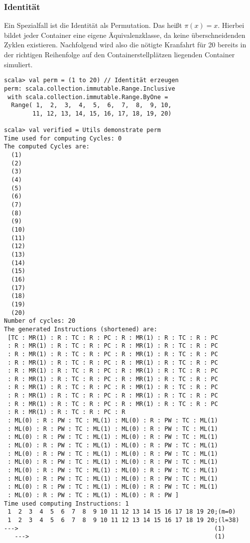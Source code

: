\subsubsection*{Identität}
Ein Spezialfall ist die Identität als Permutation. Das heißt $\pi(x) = x$.
Hierbei bildet jeder Container eine eigene Äquivalenzklasse, da keine überschneidenden Zyklen existieren.
Nachfolgend wird also die nötigte Kranfahrt für 20 bereits in der richtigen Reihenfolge auf den Containerstellplätzen liegenden Container simuliert.
\begin{lstlisting}
scala> val perm = (1 to 20) // Identität erzeugen
perm: scala.collection.immutable.Range.Inclusive
 with scala.collection.immutable.Range.ByOne =
  Range( 1,  2,  3,  4,  5,  6,  7,  8,  9, 10,
        11, 12, 13, 14, 15, 16, 17, 18, 19, 20)

scala> val verified = Utils demonstrate perm
Time used for computing Cycles: 0
The computed Cycles are: 
  (1)
  (2)
  (3)
  (4)
  (5)
  (6)
  (7)
  (8)
  (9)
  (10)
  (11)
  (12)
  (13)
  (14)
  (15)
  (16)
  (17)
  (18)
  (19)
  (20)
Number of cycles: 20
The generated Instructions (shortened) are: 
 [TC : MR(1) : R : TC : R : PC : R : MR(1) : R : TC : R : PC
 : R : MR(1) : R : TC : R : PC : R : MR(1) : R : TC : R : PC
 : R : MR(1) : R : TC : R : PC : R : MR(1) : R : TC : R : PC
 : R : MR(1) : R : TC : R : PC : R : MR(1) : R : TC : R : PC
 : R : MR(1) : R : TC : R : PC : R : MR(1) : R : TC : R : PC
 : R : MR(1) : R : TC : R : PC : R : MR(1) : R : TC : R : PC
 : R : MR(1) : R : TC : R : PC : R : MR(1) : R : TC : R : PC
 : R : MR(1) : R : TC : R : PC : R : MR(1) : R : TC : R : PC
 : R : MR(1) : R : TC : R : PC : R : MR(1) : R : TC : R : PC
 : R : MR(1) : R : TC : R : PC : R
 : ML(0) : R : PW : TC : ML(1) : ML(0) : R : PW : TC : ML(1) 
 : ML(0) : R : PW : TC : ML(1) : ML(0) : R : PW : TC : ML(1)
 : ML(0) : R : PW : TC : ML(1) : ML(0) : R : PW : TC : ML(1)
 : ML(0) : R : PW : TC : ML(1) : ML(0) : R : PW : TC : ML(1)
 : ML(0) : R : PW : TC : ML(1) : ML(0) : R : PW : TC : ML(1)
 : ML(0) : R : PW : TC : ML(1) : ML(0) : R : PW : TC : ML(1)
 : ML(0) : R : PW : TC : ML(1) : ML(0) : R : PW : TC : ML(1)
 : ML(0) : R : PW : TC : ML(1) : ML(0) : R : PW : TC : ML(1)
 : ML(0) : R : PW : TC : ML(1) : ML(0) : R : PW : TC : ML(1)
 : ML(0) : R : PW : TC : ML(1) : ML(0) : R : PW ] 
Time used computing Instructions: 1
 1  2  3  4  5  6  7  8  9 10 11 12 13 14 15 16 17 18 19 20;(m=0)
 1  2  3  4  5  6  7  8  9 10 11 12 13 14 15 16 17 18 19 20;(l=38)
--->                                                       (1)
   --->                                                    (1)

\end{lstlisting}
